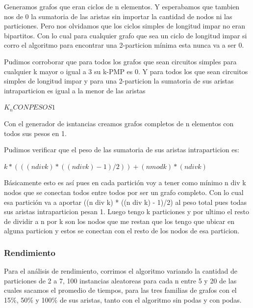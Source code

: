 Generamos grafos que eran ciclos de n elementos. Y esperabamos que tambien nos de 0 la sumatoria de las aristas sin importar la cantidad de nodos ni las particiones. Pero nos olvidamos que los ciclos simples de longitud impar no eran bipartitos. Con lo cual para cualquier grafo que sea un ciclo de longitud impar si corro el algoritmo para encontrar una 2-particion m\'inima esta nunca va a ser 0.

Pudimos corroborar que para todos los grafos que sean circuitos simples para cualquier k mayor o igual a 3 su k-PMP es 0. Y para todos los que sean circuitos simples de longitud impar y para una 2-particion la sumatoria de sus aristas intraparticion es igual a la menor de las aristas

$K_n CON PESOS 1$

Con el generador de isntancias creamos grafos completos de n elementos con todos sus pesos en 1.

Pudimos verificar que el peso de las sumatoria de sus aristas intraparticion es:

\bc
	$k * (((n  div  k) * ((n  div  k) - 1)/2)) + (n  mod  k) * (n  div  k)$
\ec

B\'asicamente esto es as\'i pues en cada partici\'on voy a tener como m\'inimo n div k nodos que se conectan todos entre todos por ser un grafo completo. Con lo cual esa partici\'on va a aportar ((n div k) * ((n div k) - 1)/2) al peso total pues todas sus aristas intraparticion pesan 1. Luego tengo k particiones y por ultimo el resto de dividir a n por k son los nodos que me restan que los tengo que ubicar en alguna particion y estos se conectan con el resto de los nodos de esa particion.


\subsubsection{Rendimiento}

Para el análisis de rendimiento, corrimos el algoritmo variando la cantidad de particiones de 2 a 7, 100 instancias aleatoreas para cada n entre 5 y 20 de las cuales sacamos el promedio de tiempos, para las tres familias de grafos con el 15\%, 50\% y 100\% de sus aristas, tanto con el algoritmo sin podas y con podas.



